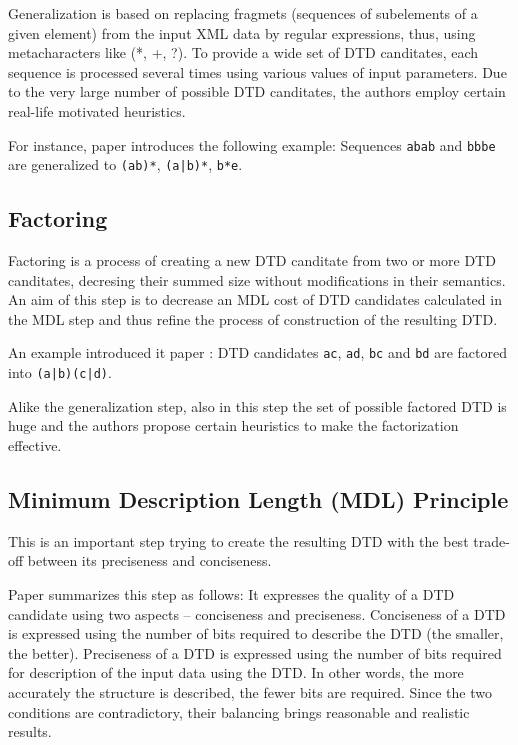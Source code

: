 Generalization is based on replacing fragmets (sequences of subelements of a given element) from the input XML data by regular expressions, thus, using metacharacters like (*, +, ?). To provide a wide set of DTD canditates, each sequence is processed several times using various values of input parameters. Due to the very large number of possible DTD canditates, the authors employ certain real-life motivated heuristics.

For instance, paper \cite{Garofalakis:2000:XSE:342009.335409} introduces the following example: Sequences \texttt{abab} and \texttt{bbbe} are generalized to \texttt{(ab)*}, \texttt{(a|b)*}, \texttt{b*e}.

\subsection{Factoring}
Factoring is a process of creating a new DTD canditate from two or more DTD canditates, decresing their summed size without modifications in their semantics. An aim of this step is to decrease an MDL cost of DTD candidates calculated in the MDL step and thus refine the process of construction of the resulting DTD.

An example introduced it paper \cite{Garofalakis:2000:XSE:342009.335409}: DTD candidates \texttt{ac}, \texttt{ad}, \texttt{bc} and \texttt{bd} are factored into \texttt{(a|b)(c|d)}.

Alike the generalization step, also in this step the set of possible factored DTD is huge and the authors propose certain heuristics to make the factorization effective.

\subsection{Minimum Description Length (MDL) Principle}
This is an important step trying to create the resulting DTD with the best trade-off between its preciseness and conciseness.  

Paper \cite{Mlynkova:2008:AAX:1494650.1495496} summarizes this step as follows: It expresses the quality of a DTD candidate using two aspects – conciseness and preciseness. Conciseness of a DTD is expressed using the number of bits required to describe the DTD (the smaller, the better). Preciseness of a DTD is expressed using the number of bits required for description of the input data using the DTD. In other words, the more accurately the structure is described, the fewer bits are required. Since the two conditions are contradictory, their balancing brings reasonable and realistic results.

